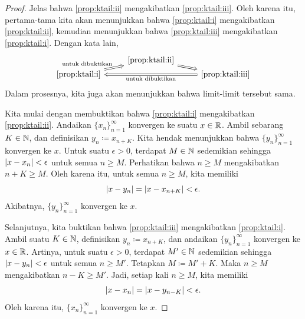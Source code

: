 \begin{proof}
Jelas bahwa
\ref{prop:ktail:ii} mengakibatkan \ref{prop:ktail:iii}.
Oleh karena itu, pertama-tama kita akan menunjukkan bahwa
\ref{prop:ktail:i}
mengakibatkan
\ref{prop:ktail:ii},
kemudian menunjukkan bahwa
\ref{prop:ktail:iii}
mengakibatkan
\ref{prop:ktail:i}.  Dengan kata lain, 
\begin{equation*}
\begin{tikzcd}[row sep=0pt]
& \text{\ref{prop:ktail:ii}} \ar[dr, Rightarrow] & \\
\text{\ref{prop:ktail:i}} \ar[ur, Rightarrow, "\text{untuk dibuktikan}"] & &
\text{\ref{prop:ktail:iii}} \ar[ll, Rightarrow, "\text{untuk dibuktikan}"] 
\end{tikzcd}
\end{equation*}
Dalam prosesnya, kita juga akan menunjukkan bahwa limit-limit tersebut sama.

Kita mulai dengan membuktikan bahwa \ref{prop:ktail:i} mengakibatkan \ref{prop:ktail:ii}.
Andaikan $\{x_n \}_{n=1}^\infty$ konvergen ke suatu $x \in {\mathbb{R}}$.
Ambil sebarang $K \in {\mathbb{N}}$, dan
definisikan $y_n \coloneqq x_{n+K}$.  Kita hendak menunjukkan bahwa $\{ y_n \}_{n=1}^\infty$ konvergen
ke $x$.
Untuk suatu $\epsilon > 0$, terdapat $M \in {\mathbb{N}}$ sedemikian sehingga
$\lvert {x-x_n} \rvert < \epsilon$ untuk semua $n \geq M$.
Perhatikan bahwa $n \geq M$ mengakibatkan $n+K \geq M$.  Oleh karena itu, untuk
semua $n \geq M$, kita memiliki
\begin{equation*}
\lvert {x-y_n} \rvert = \lvert {x-x_{n+K}} \rvert < \epsilon .
\end{equation*}
Akibatnya, $\{ y_n \}_{n=1}^\infty$ konvergen ke $x$.

Selanjutnya, kita buktikan bahwa \ref{prop:ktail:iii} mengakibatkan \ref{prop:ktail:i}.
Ambil suatu $K \in {\mathbb{N}}$, definisikan
$y_n \coloneqq x_{n+K}$, dan andaikan $\{ y_n \}_{n=1}^\infty$ konvergen ke $x \in {\mathbb{R}}$.
Artinya, untuk suatu $\epsilon > 0$, terdapat $M' \in {\mathbb{N}}$ sedemikian sehingga
$\lvert {x-y_n} \rvert < \epsilon$ untuk semua $n \geq M'$.
Tetapkan $M \coloneqq M'+K$.  Maka $n \geq M$ mengakibatkan $n-K \geq M'$.
Jadi, setiap kali $n \geq M$, kita memiliki
\begin{equation*}
\lvert {x-x_n} \rvert = \lvert {x-y_{n-K}} \rvert < \epsilon.
\end{equation*}
Oleh karena itu, $\{ x_n \}_{n=1}^\infty$ konvergen ke $x$.
\end{proof}

